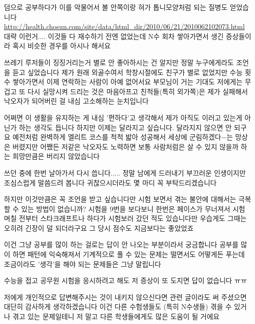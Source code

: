     덤으로 공부하다가 이를 악물어서 볼 안쪽이랑 혀가 톱니모양처럼 되는 질병도 얻었습니다
    \url{http://health.chosun.com/site/data/html_dir/2010/06/21/2010062102073.html} 대략 이런거....
    이것들 다 재수하기 전엔 없었는데 N수 회차 쌓아가면서 생긴 증상들이라 혹시 비슷한 경우를 아시나 해서요
    \vspace{5mm}

    쓰레기 루저들이 징징거리는거 별로 안 좋아하시는 건 알지만 정말 누구에게라도 조언을 듣고 싶었습니다
    제가 원래 외골수여서 학창시절에도 친구가 별로 없었지만 수능 횟수 쌓아가면서 이제 연락하는 사람이 아예 없어서요
    부모님이 거는 기대도 저에게는 무겁고 또 다시 실망시켜 드리는 것은 마음아프고
    친척들(특히 외가쪽)은 제가 실패해서 낙오자가 되어버린 걸 내심 고소해하는 눈치입니다
    \vspace{5mm}

    어쩌면 이 생활을 유지하는 게 내심 '편하다'고 생각해서 제가 아직도 이러고 있는게 아닌가 하는 생각도 듭니다
    하지만 이제는 달라지고 싶습니다. 달라지지 않으면 안 되구요
    예전처럼 완벽하게 엘리트 코스를 척척 밟아 성공해서 세상에 군림하겠다$-$는 망상은 버렸지만
    어쨌든 저같은 낙오자도 노력하면 보통 사람처럼은 살 수 있지 않을까 하는 희망만큼은 버리지 않았습니다
    \vspace{5mm}

    쓰던 중에 한번 날아가서 다시 씁니다.....
    정말 남에게 드러내기 부끄러운 인생이지만 조심스럽게 말씀드려 봅니다
    귀찮으시더라도 몇 마디 꼭 부탁드리겠습니다
    \vspace{5mm}

    하지만 이것만큼은 꼭 조언을 받고 싶습니다만 시험 보면서 겪는 불안에 대해서는 극복할 수 있는 방법이 없습니까?
    시험을 9번을 보다보니 한번은 페이스가 무너져서 시험 며칠 전부터 스타크래프트나 하다가 시험보러 갔던 적도 있습니다만
    우습게도 그때는 오히려 긴장이 덜 되더라구요 그 당시 점수도 지금보다는 좋았었죠
    \vspace{5mm}

    이건 그냥 공부를 많이 하는 걸로는 답이 안 나오는 부분이라서 궁금합니다
    공부를 많이 하면 패턴에 익숙해져서 기계적으로 풀 수 있는 문제는 떨면서도 어떻게든 푸는데
    조금이라도 '생각'을 해야 되는 문제들은 그냥 말립니다
    \vspace{5mm}

    수능을 접고 공무원 시험을 응시하려고 해도 저 증상이 또 도지면 답이 없습니다 ㅠㅠ
    \vspace{5mm}

    저에게 개인적으로 답변해주시는 것이 내키지 않으신다면 관련 글이라도 써 주셨으면 대단히 감사하게 생각하겠습니다
    이건 다른 수험생들도 (특히 N수생들) 겪을 수 있거나 겪고 있는 문제일테니 저 말고 다른 학생들에게도 많은 도움이 될 거에요
    \vspace{5mm}

